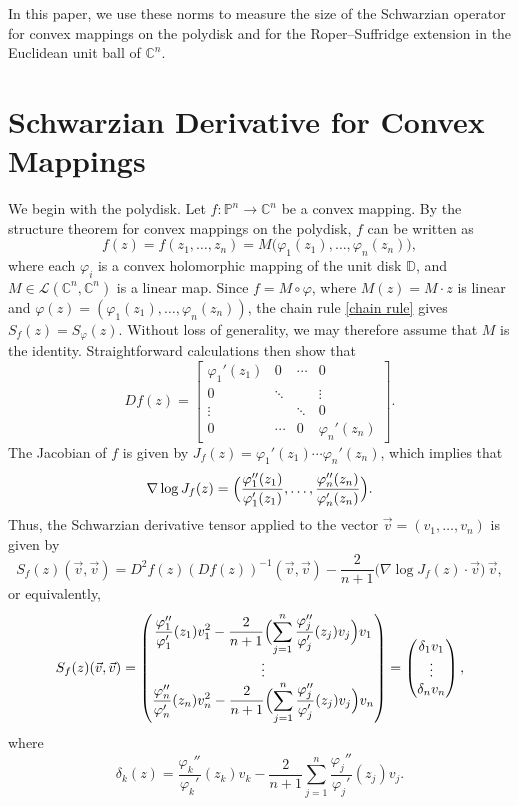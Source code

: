 \documentclass[12pt]{amsart}
\theoremstyle{definition}
\theoremstyle{remark}
\numberwithin{equation}{section}
\begin{document}
In this paper, we use these norms to measure the size of the Schwarzian
operator for convex mappings on the polydisk and for the Roper--Suffridge
extension in the Euclidean unit ball of $\mathbb{C}^n$.

\section{Schwarzian Derivative for Convex Mappings}\label{sec:main}

We begin with the polydisk. Let $f:\mathbb{P}^n\to\mathbb{C}^n$ be a convex
mapping. By the structure theorem for convex mappings on the polydisk, $f$
can be written as
\[
f(z)=f(z_1,\ldots,z_n) = M\bigl(\varphi_1(z_1),\dots,\varphi_n(z_n)\bigr),
\]
where each $\varphi_i$ is a convex holomorphic mapping of the unit disk
$\mathbb{D}$, and $M\in\mathcal{L}(\mathbb{C}^n,\mathbb{C}^n)$ is a linear
map. Since $f=M\circ \varphi$, where $M(z)=M\cdot z$ is linear and
$\varphi(z)=(\varphi_1(z_1),\ldots, \varphi_n(z_n))$, the chain rule
\eqref{chain rule} gives $S_f(z)=S_\varphi(z)$. Without loss of generality,
we may therefore assume that $M$ is the identity. Straightforward calculations
then show that
\[
Df(z)=
\begin{bmatrix}
  \varphi_1'(z_1) & 0 & \cdots & 0 \\
  0 & \ddots & & \vdots \\
  \vdots & & \ddots & 0 \\
  0 & \cdots & 0 & \varphi_n'(z_n)
\end{bmatrix}.
\]
The Jacobian of $f$ is given by
$J_f(z)=\varphi_1'(z_1)\cdots\varphi_n'(z_n)$, which implies that
\[
\nabla\log J_f(z)
=\Bigl(\dfrac{\varphi_1''(z_1)}{\varphi_1'(z_1)},\dots,
\dfrac{\varphi_n''(z_n)}{\varphi_n'(z_n)}\Bigr).
\]
Thus, the Schwarzian derivative tensor applied to the vector
$\vec{v}=(v_1,\ldots,v_n)$ is given by
\[
S_f(z)(\vec{v},\vec{v})
= D^2f(z)(Df(z))^{-1}(\vec{v},\vec{v})
-\frac{2}{n+1}\bigl(\nabla\log J_f(z)\cdot\vec{v}\bigr)\,\vec{v},
\]
or equivalently,
\[
S_f(z)(\vec{v},\vec{v})
=
\begin{pmatrix}
  \displaystyle\frac{\varphi_1''}{\varphi_1'}(z_1)v_1^2
  -\displaystyle\frac{2}{n+1}
  \Bigl(\sum_{j=1}^n\frac{\varphi_j''}{\varphi_j'}(z_j)v_j\Bigr)v_1 \\
  \vdots \\
  \displaystyle\frac{\varphi_n''}{\varphi_n'}(z_n)v_n^2
  -\displaystyle\frac{2}{n+1}
  \Bigl(\sum_{j=1}^n\frac{\varphi_j''}{\varphi_j'}(z_j)v_j\Bigr)v_n
\end{pmatrix}
=
\begin{pmatrix} \delta_1 v_1\\\vdots \\ \delta_n v_n\end{pmatrix},
\]
where
\[
\delta_k(z)=\frac{\varphi_k''}{\varphi_k'}(z_k)v_k
-\frac{2}{n+1}\sum_{j=1}^n\frac{\varphi_j''}{\varphi_j'}(z_j)v_j.
\]
\end{document}
